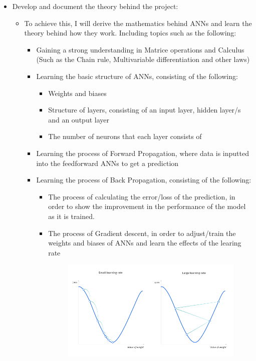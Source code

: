 \documentclass[10pt,a4paper]{article}
\begin{document}
\begin{itemize}
    \item Develop and document the theory behind the project:
    \begin{itemize}
        \item To achieve this, I will derive the mathematics behind ANNs and learn the theory behind how they work. Including topics such as the following:
        \begin{itemize}
            \item Gaining a strong understanding in Matrice operations and Calculus (Such as the Chain rule, Multivariable differentiation and other laws)
            \item Learning the basic structure of ANNs, consisting of the following:
            \begin{itemize}
                \item Weights and biases
                \item Structure of layers, consisting of an input layer, hidden layer/s and an output layer
                \item The number of neurons that each layer consists of
            \end{itemize}
            \item Learning the process of Forward Propagation, where data is inputted into the feedforward ANNs to get a prediction
            \item Learning the process of Back Propagation, consisting of the following:
            \begin{itemize}
                \item The process of calculating the error/loss of the prediction, in order to show the improvement in the performance of the model as it is trained.
                \item The process of Gradient descent, in order to adjust/train the weights and biases of ANNs and learn the effects of the learing rate
                      \begin{figure}[h!]
                      \centering
                      \includegraphics[width=1\textwidth]{./write-up/src/images/gradient-descent.png}

\end{figure}
\end{itemize}
\end{itemize}
\end{itemize}
\end{itemize}
\end{document}
